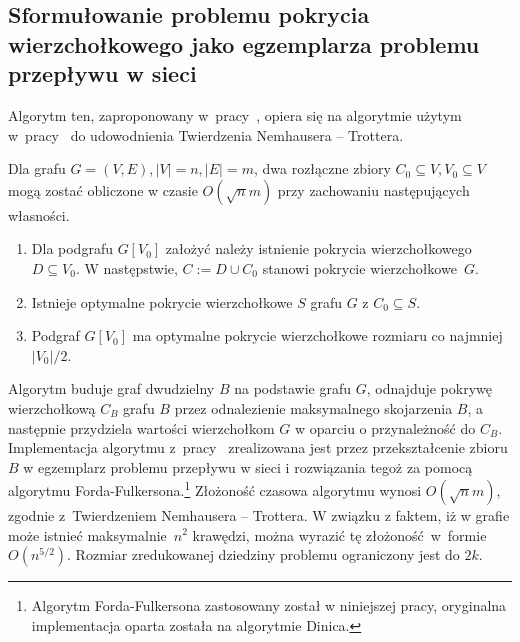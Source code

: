 \subsection{Sformułowanie problemu pokrycia wierzchołkowego jako egzemplarza problemu przepływu w sieci}\label{Kernelization_network_flow}
Algorytm ten, zaproponowany w~pracy~\cite{KernelizationAlgorithms04}, opiera się na
algorytmie użytym w~pracy~\cite{Niedermeier02} do udowodnienia Twierdzenia
Nemhausera -- Trottera.

\begin{theorem}
  Dla grafu $G=(V,E), |V|=n, |E|=m$, dwa rozłączne zbiory $C_0 \subseteq V,
  V_0 \subseteq V$ mogą zostać obliczone w czasie $O(\sqrt{n}m)$ przy zachowaniu
  następujących własności.
  \begin{enumerate}
    \item Dla podgrafu $G[V_0]$ założyć należy istnienie pokrycia wierzchołkowego $D \subseteq
      V_0$. W następstwie, $C := D \cup C_0$ stanowi pokrycie wierzchołkowe~$G$.
    \item Istnieje optymalne pokrycie wierzchołkowe $S$ grafu $G$ z $C_0
      \subseteq S$.
    \item Podgraf $G[V_0]$ ma optymalne pokrycie wierzchołkowe rozmiaru co
      najmniej $|V_0|/2$. 
  \end{enumerate}
\end{theorem}

Algorytm buduje graf dwudzielny $B$ na podstawie grafu $G$, odnajduje pokrywę
wierzchołkową $C_B$ grafu $B$ przez odnalezienie maksymalnego skojarzenia $B$,
a następnie przydziela wartości wierzchołkom $G$ w oparciu o przynależność do
$C_B$.
Implementacja algorytmu z~pracy~\cite{Niedermeier02} zrealizowana jest przez
przekształcenie zbioru $B$ w egzemplarz problemu przepływu w sieci i rozwiązania tegoż
za pomocą algorytmu Forda-Fulkersona.\footnote{Algorytm Forda-Fulkersona
  zastosowany został w niniejszej pracy, oryginalna implementacja oparta została
na algorytmie Dinica.}
Złożoność czasowa algorytmu wynosi $O(\sqrt{n}m)$, zgodnie z~Twierdzeniem
Nemhausera -- Trottera. 
W związku z faktem, iż w grafie może istnieć maksymalnie~$n^2$ krawędzi, można
wyrazić tę złożoność~w~formie $O(n^{5/2})$.
Rozmiar zredukowanej dziedziny problemu ograniczony jest do $2k$.

